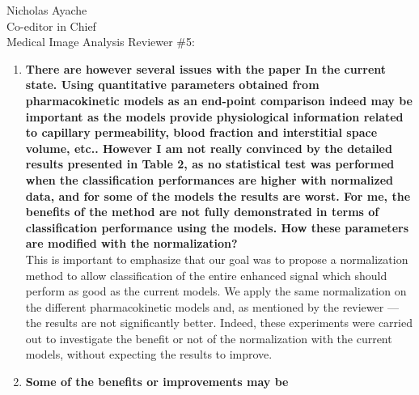 \documentclass{letter}
\begin{document}
\begin{letter}{Nicholas Ayache \\ Co-editor in Chief \\ Medical Image Analysis}
  Reviewer \#5:
  \begin{enumerate}
  \item \textbf{There are however several issues with the paper In the
      current state. Using quantitative parameters obtained from
      pharmacokinetic models as an end-point comparison indeed may be
      important as the models provide physiological information
      related to capillary permeability, blood fraction and
      interstitial space volume, etc.. However I am not really
      convinced by the detailed results presented in Table 2, as no
      statistical test was performed when the classification
      performances are higher with normalized data, and for some of
      the models the results are worst. For me, the benefits of the
      method are not fully demonstrated in terms of classification
      performance using the models. How these parameters are modified
      with the normalization?}\\
    This is important to emphasize that our goal was to propose a
    normalization method to allow classification of the entire
    enhanced signal which should perform as good as the current
    models. We apply the same normalization on the different
    pharmacokinetic models and, as mentioned by the reviewer ---
    the results are not significantly better.
    Indeed, these experiments were carried out to investigate the
    benefit or not of the normalization with the current models,
    without expecting the results to improve.
  \item \textbf{Some of the benefits or improvements may be
}
\end{enumerate}
\end{letter}
\end{document}
